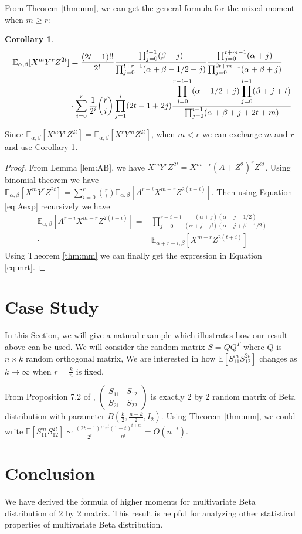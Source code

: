 \documentclass{elsarticle}
\def\E{\mathbb{E}}
\newtheorem{cor}{Corollary}
\begin{document}
From Theorem \ref{thm:mm},
we can get
the general formula for the mixed moment when $m\geq r$:
\begin{cor}\label{cor:mr}
	\begin{align}
	\E_{\alpha, \beta}[X^mY^rZ^{2t}] &= \frac{(2t-1)!!}{2^t}
	\frac{\prod_{j=0}^{t-1} (\beta+j)}{\prod_{j=0}^{t+r-1} (\alpha+\beta-1/2+j)}
	\frac{\prod_{j=0}^{t+m-1}(\alpha+j)}{\prod_{j=0}^{2t+m-1} (\alpha+\beta+j)}\notag\\
	&\cdot\sum_{i=0}^r \frac{1}{2^i}\binom{r}{i}\prod_{j=1}^i (2t-1+2j)
	\frac{\displaystyle\prod_{j=0}^{r-i-1}(\alpha-1/2+j)
		\prod_{j=0}^{i-1}(\beta+j+t)}{\prod_{j=0}^{i-1}(\alpha+\beta+j+2t+m)}
	\label{eq:mrt}
	\end{align}
\end{cor}
Since $\E_{\alpha, \beta}[X^mY^rZ^{2t}]=\E_{\alpha, \beta}[X^rY^mZ^{2t}]$, 
when $m<r$ we can exchange $m$ and $r$ and use Corollary \ref{cor:mr}.
\begin{proof}
	From Lemma \ref{lem:AB}, we have
	$X^m Y^r Z^{2t} = X^{m-r}(A+Z^2)^r Z^{2t} $.
	Using binomial theorem we have
	$\E_{\alpha, \beta}[X^m Y^r Z^{2t}] = \sum_{i=0}^r \binom{r}{i}\E_{\alpha, \beta}
	[A^{r-i}X^{m-r}Z^{2(t+i)}]$. Then using Equation \eqref{eq:Aexp} recursively
	we have 
	\begin{align*}
	\E_{\alpha, \beta}
	[A^{r-i}X^{m-r}Z^{2(t+i)}] =&
	\prod_{j=0}^{r-i-1}\frac{(\alpha+j)(\alpha+j-1/2)}
	{(\alpha+j+\beta)(\alpha+j+\beta-1/2)} \\
	\cdot & \E_{\alpha+r-i, \beta}
	[X^{m-r}Z^{2(t+i)}]
	\end{align*}
	Using Theorem \ref{thm:mm} we can finally get the expression in
	Equation \eqref{eq:mrt}.
\end{proof}
\section{Case Study}
In this Section, we will give a natural example which illustrates how our result above can be used.
We will consider the random matrix $S=QQ^T$ where $Q$ is $n\times k$ random orthogonal matrix,
We are interested in how $\E[S_{11}^mS_{12}^{2t}]$ changes as $k\to \infty$ when $r=\frac{k}{n}$ is fixed.

From Proposition 7.2 of \cite{eaton1989group},
$
\begin{pmatrix}
S_{11} & S_{12} \\
S_{21} & S_{22}
\end{pmatrix}
$
is exactly 2 by 2 random matrix of Beta distribution with parameter $B(\frac{k}{2}, \frac{n-k}{2}, I_2)$.
Using Theorem \ref{thm:mm}, we could write
$\E[S_{11}^mS_{12}^{2t}] \sim \frac{(2t-1)!!}{2^t} \frac{r^t(1-t)^{t+m}}{n^t} = O(n^{-t})$.

\section{Conclusion}
We have derived the formula of higher moments for multivariate Beta distribution
of 2 by 2 matrix. This result is helpful for analyzing other statistical properties of multivariate Beta distribution.


\end{document}
